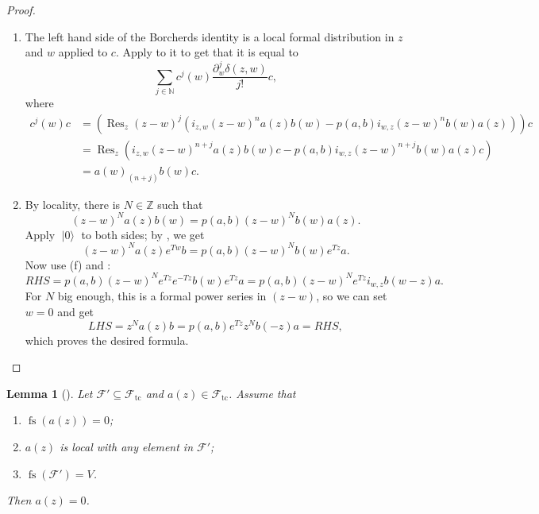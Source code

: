 \documentclass[a4paper, 12pt, reqno]{amsart}
\newtheorem{lemma}[theorem]{Lemma}
\theoremstyle{remark}
\numberwithin{equation}{subsection}
\DeclareMathOperator{\Res}{Res}
\DeclareMathOperator{\vac}{|0\rangle}
\DeclareMathOperator{\fs}{fs}
\DeclareMathOperator{\tc}{tc}
\begin{document}
\begin{proof}
\begin{enumerate}
  \item The left hand side of the Borcherds identity is a local formal distribution in $z$ and $w$ applied to $c$.
    Apply  to it to get that it is equal to
    \begin{equation*}
      \sum_{j \in \mathbb{N}} c^j(w)\frac{\partial^j_w\delta(z,w)}{j!}c,
    \end{equation*}
    where
    \begin{align*}
      c^j(w)c &= (\Res_z(z - w)^j(i_{z, w}(z - w)^na(z)b(w) - p(a, b)i_{w, z}(z - w)^nb(w)a(z)))c \\
      &= \Res_z(i_{z, w}(z - w)^{n + j}a(z)b(w)c - p(a, b)i_{w, z}(z - w)^{n + j}b(w)a(z)c) \\
      &= a(w)_{(n + j)}b(w)c.
    \end{align*}
  \item By locality, there is $N \in \mathbb{Z}$ such that
    \begin{equation*}
      (z - w)^Na(z)b(w) = p(a, b)(z - w)^Nb(w)a(z).
    \end{equation*}
    Apply $\vac$ to both sides; by , we get
    \begin{equation*}
      (z - w)^Na(z)e^{Tw}b = p(a, b)(z - w)^Nb(w)e^{Tz}a.
    \end{equation*}
    Now use (f) and :
    \begin{equation*}
      RHS = p(a, b)(z - w)^Ne^{Tz}e^{-Tz}b(w)e^{Tz}a = p(a, b)(z - w)^Ne^{Tz}i_{w, z}b(w - z)a.
    \end{equation*}
    For $N$ big enough, this is a formal power series in $(z - w)$, so we can set $w = 0$ and get
    \begin{equation*}
      LHS = z^Na(z)b = p(a, b)e^{Tz}z^Nb(-z)a = RHS,
    \end{equation*}
    which proves the desired formula. \qedhere
  \end{enumerate}
\end{proof}

\begin{lemma}[{\cite[Lemma 3]{callegaro_introduction_2017}}]
  \label{lmm:5}
  Let $\mathcal{F}' \subseteq \mathcal{F}_{\tc}$ and $a(z) \in \mathcal{F}_{\tc}$.
  Assume that
  \begin{enumerate}
  \item $\fs(a(z)) = 0$;
  \item $a(z)$ is local with any element in $\mathcal{F}'$;
  \item $\fs(\mathcal{F}') = V$.
  \end{enumerate}
  Then $a(z) = 0$.
\end{lemma}
\end{document}
